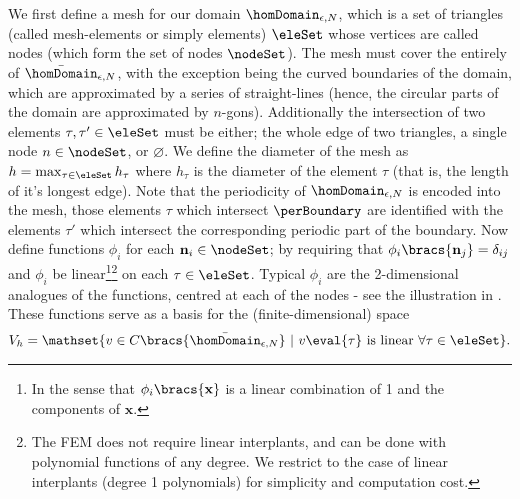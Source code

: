 We first define a mesh for our domain $\homDomain_{\epsilon, N}$, which is a set of triangles (called mesh-elements or simply elements) $\eleSet$ whose vertices are called nodes (which form the set of nodes $\nodeSet$).
The mesh must cover the entirely of $\bar{\homDomain}_{\epsilon, N}$, with the exception being the curved boundaries of the domain, which are approximated by a series of straight-lines (hence, the circular parts of the domain are approximated by $n$-gons).
Additionally the intersection of two elements $\tau, \tau'\in\eleSet$ must be either; the whole edge of two triangles, a single node $n\in\nodeSet$, or $\varnothing$.
We define the diameter of the mesh as $h=\max_{\tau\in\eleSet}h_{\tau}$ where $h_{\tau}$ is the diameter of the element $\tau$ (that is, the length of it's longest edge).
Note that the periodicity of $\homDomain_{\epsilon, N}$ is encoded into the mesh, those elements $\tau$ which intersect $\perBoundary$ are identified with the elements $\tau'$ which intersect the corresponding periodic part of the boundary.
Now define functions $\phi_{i}$ for each $\mathbf{n}_{i}\in\nodeSet$; by requiring that $\phi_{i}\bracs{\mathbf{n}_{j}}=\delta_{ij}$ and $\phi_{i}$ be linear\footnote{In the sense that $\phi_{i}\bracs{\mathbf{x}}$ is a linear combination of 1 and the components of $\mathbf{x}$.}\footnote{The FEM does not require linear interplants, and can be done with polynomial functions of any degree. We restrict to the case of linear interplants (degree 1 polynomials) for simplicity and computation cost.} on each $\tau\in\eleSet$.
Typical $\phi_{i}$ are the 2-dimensional analogues of the  functions, centred at each of the nodes - see the illustration in .
These functions serve as a basis for the (finite-dimensional) space 
\begin{align*}
	V_{h} = \mathset{v\in C\bracs{\bar{\homDomain}_{\epsilon, N}} \text{ }\vert\text{ } v\eval{\tau} \text{ is linear } \forall\tau\in\eleSet}. 
\end{align*} \newline
